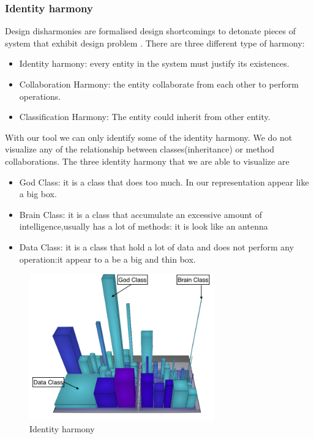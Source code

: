 \documentclass[]{usiinfbachelorproject}
\begin{document}
\subsubsection{Identity harmony	}\label{sec:idHarmony}

Design disharmonies are formalised design shortcomings to detonate pieces of system that exhibit design problem \cite{Disharmony}. 
There are three different type of harmony:
\begin{itemize}
\item Identity harmony: every entity in the system must justify its existences.
\item Collaboration Harmony:  the entity collaborate from each other to perform operations.
\item Classification Harmony: The entity could inherit from other entity. 
\end{itemize} 
With our tool we can only identify some of the identity harmony. We do not visualize any of the relationship between classes(inheritance) or method collaborations.
The three identity harmony that we are able to visualize are
\begin{itemize}
\item{God Class}: it is a class that does too much. In our representation appear like a big box.
\item{Brain Class}: it is a class that accumulate an excessive amount of intelligence,usually has a lot of methods: it is look like an antenna
\item{Data Class}: it is a class that hold a lot of data and does not perform any operation:it appear to a be a big and thin box.

\end{itemize} 
\begin{figure}[h]
	\centering
\includegraphics[width=8cm]{images/disharmony}

\caption{Identity harmony\label {fig:harmony}}
\end{figure}
\end{document}
